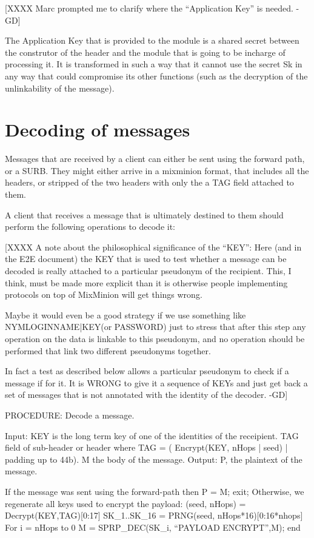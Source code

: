 [XXXX Marc prompted me to clarify where the ``Application Key'' is 
	needed. -GD]
 
The Application Key that is provided to the module is a shared secret 
between the construtor of the header and the module that is going to be 
incharge of processing it. It is transformed in such a way that it cannot 
use the secret Sk in any way that could compromise its other functions 
(such as the decryption of the unlinkability of the message).

\section{Decoding of messages}

Messages that are received by a client can either be sent using the
forward path, or a SURB. They might either arrive in a mixminion
format, that includes all the headers, or stripped of the two headers
with only the a TAG field attached to them.

A client that receives a message that is ultimately destined to them
should perform the following operations to decode it:

[XXXX A note about the philosophical significance of the ``KEY'':
	Here (and in the E2E document) the KEY that is used to test 
	whether a message can be decoded is really attached to a 
	particular pseudonym of the recipient. This, I think, must 
	be made more explicit than it is otherwise people implementing 
	protocols on top of MixMinion will get things wrong.

	Maybe it would even be a good strategy if we use something like
	NYMLOGINNAME|KEY(or PASSWORD) just to stress that after this step 
	any operation on the data is linkable to this pseudonym, 
	and no operation should be performed that link two different 
	pseudonyms together. 
	
	In fact a test as described below allows a particular pseudonym 
	to check if a message if for it. It is WRONG to give it a sequence 
	of KEYs and just get back a set of messages that is not annotated 
	with the identity of the decoder. -GD]


PROCEDURE: Decode a message.

Input:  KEY is the long term key of one of the identities of the receipient.
	TAG field of sub-header or header where 
        TAG = ( Encrypt(KEY, nHops | seed) | padding up to 44b).
        M the body of the message.
Output: P, the plaintext of the message.

	If the message was sent using the forward-path then 
		P = M; exit;
	Otherwise, we regenerate all keys used to encrypt the payload:
		(seed, nHops) = Decrypt(KEY,TAG)[0:17]
		SK_1..SK_16 = PRNG(seed, nHops*16)[0:16*nhops]
		For i = nHops to 0
			M = SPRP_DEC(SK_i, ``PAYLOAD ENCRYPT'',M);
		end

